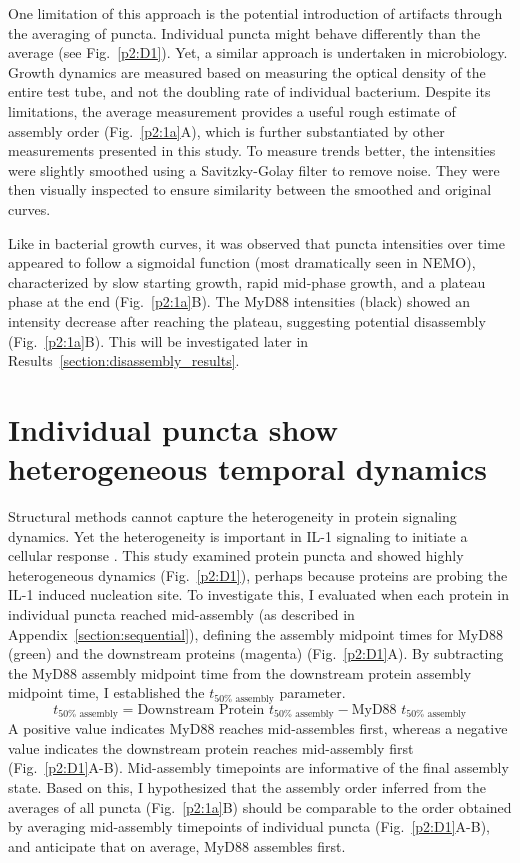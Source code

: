 One limitation of this approach is the potential introduction of artifacts through the averaging of puncta. Individual puncta might behave differently than the average (see Fig.~\ref{p2:D1}). Yet, a similar approach is undertaken in microbiology. Growth dynamics are measured based on measuring the optical density of the entire test tube, and not the doubling rate of individual bacterium. Despite its limitations, the average measurement provides a useful rough estimate of assembly order (Fig.~\ref{p2:1a}A), which is further substantiated by other measurements presented in this study. To measure trends better, the intensities were slightly smoothed using a Savitzky-Golay filter to remove noise. They were then visually inspected to ensure similarity between the smoothed and original curves.

Like in bacterial growth curves, it was observed that puncta intensities over time appeared to follow a sigmoidal function (most dramatically seen in NEMO), characterized by slow starting growth, rapid mid-phase growth, and a plateau phase at the end (Fig.~\ref{p2:1a}B). The MyD88 intensities (black) showed an intensity decrease after reaching the plateau, suggesting potential disassembly (Fig.~\ref{p2:1a}B). This will be investigated later in Results~\ref{section:disassembly_results}.

\section{Individual puncta show heterogeneous temporal dynamics}
Structural methods \autocite{Lin_2010} cannot capture the heterogeneity in protein signaling dynamics. Yet the heterogeneity is important in IL-1 signaling to initiate a cellular response \autocite{DeFelice_2019}. This study examined protein puncta and showed highly heterogeneous dynamics (Fig.~\ref{p2:D1}), perhaps because proteins are probing the IL-1 induced nucleation site. To investigate this, I evaluated when each protein in individual puncta reached mid-assembly (as described in Appendix~\ref{section:sequential}), defining the assembly midpoint times for MyD88 (green) and the downstream proteins (magenta) (Fig.~\ref{p2:D1}A). By subtracting the MyD88 assembly midpoint time from the downstream protein assembly midpoint time, I established the $t_{50\%\text{ assembly}}$ parameter. 
\begin{equation*}
t_{50\%\text{ assembly}} = \text{Downstream Protein } t_{50\%\text{ assembly}} - \text{MyD88 }t_{50\%\text{ assembly}}
\end{equation*}
A positive value indicates MyD88 reaches mid-assembles first, whereas a negative value indicates the downstream protein reaches mid-assembly first (Fig.~\ref{p2:D1}A-B). Mid-assembly timepoints are informative of the final assembly state. Based on this, I hypothesized that the assembly order inferred from the averages of all puncta (Fig.~\ref{p2:1a}B) should be comparable to the order obtained by averaging mid-assembly timepoints of individual puncta (Fig.~\ref{p2:D1}A-B), and anticipate that on average, MyD88 assembles first.

